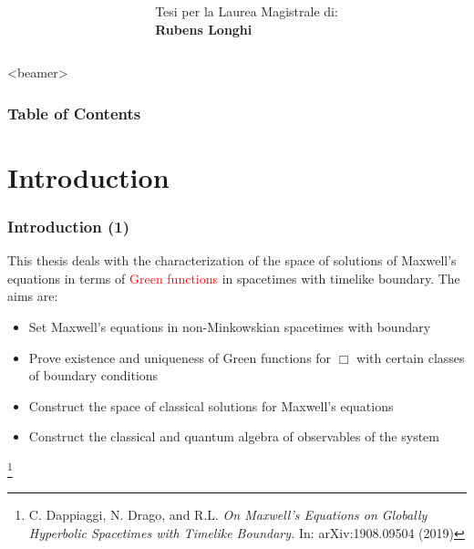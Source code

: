 \documentclass[10pt]{beamer} %
\newcommand{\red}[1]{\textcolor{red}{#1}}
\newcommand\blfootnote[1]{%
	\begingroup
	\renewcommand\thefootnote{}\footnote{#1}%
	\addtocounter{footnote}{-1}%
	\endgroup
}
\begin{document}
\begin{frame}
\begin{columns}[t]
\begin{column}{.3\linewidth}
		
	\end{column}
	
	
	\begin{column}{.4\linewidth}
		\vspace{-0.3cm}
		\begin{flushright}
	{\footnotesize Tesi per la Laurea Magistrale di:\\ \textbf{Rubens Longhi}} %
		\end{flushright}
		
		
		
		
	\end{column}
	
	
\end{columns}

	
	




	
\end{frame}

\begin{frame}<beamer>
	\frametitle{Table of Contents}
	\tableofcontents
\end{frame}

\section{Introduction}


\begin{frame}
		\frametitle{Introduction (1)}
		
		This thesis deals with the characterization of the space of solutions of Maxwell's equations in terms of \red{Green functions} in spacetimes with timelike boundary. The aims are:
		\vskip0.5cm
		\begin{itemize}[<+-| alert@+>]
			\item Set Maxwell's equations in non-Minkowskian spacetimes with boundary\vskip0.25cm
			\item Prove existence and uniqueness of Green functions for $\Box$ with certain classes of boundary conditions\vskip0.25cm
			\item Construct the space of classical solutions for Maxwell's equations\vskip0.25cm
			\item Construct the classical and quantum algebra of observables of the system
		\end{itemize}
	\blfootnote{\scriptsize  C. Dappiaggi, N. Drago, and R.L. \emph{On Maxwell’s Equations
			on Globally Hyperbolic Spacetimes with Timelike Boundary.} In: arXiv:1908.09504 (2019)}
\end{frame}
\end{document}
